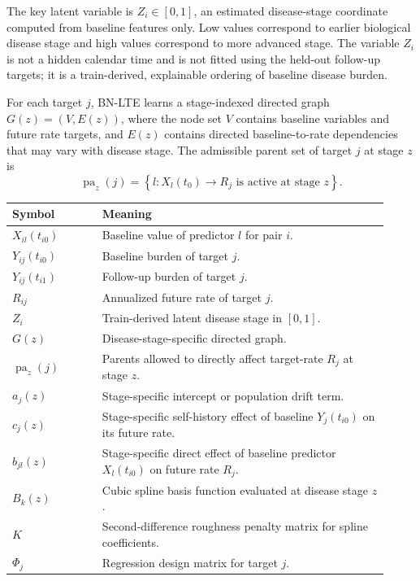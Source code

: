 The key latent variable is $Z_i \in [0,1]$, an estimated disease-stage
coordinate computed from baseline features only. Low values correspond to
earlier biological disease stage and high values correspond to more advanced
stage. The variable $Z_i$ is not a hidden calendar time and is not fitted using
the held-out follow-up targets; it is a train-derived, explainable ordering of
baseline disease burden.

For each target $j$, BN-LTE learns a stage-indexed directed graph
$G(z)=(V,E(z))$, where the node set $V$ contains baseline variables and future
rate targets, and $E(z)$ contains directed baseline-to-rate dependencies that
may vary with disease stage. The admissible parent set of target $j$ at stage
$z$ is
\begin{equation}
\operatorname{pa}_z(j)
=
\left\{
l : X_l(t_0) \rightarrow R_j
\text{ is active at stage } z
\right\}.
\end{equation}

\begin{center}
\begin{tabular}{p{0.22\linewidth}p{0.70\linewidth}}
Symbol & Meaning \\
\hline
$X_{il}(t_{i0})$ & Baseline value of predictor $l$ for pair $i$. \\
$Y_{ij}(t_{i0})$ & Baseline burden of target $j$. \\
$Y_{ij}(t_{i1})$ & Follow-up burden of target $j$. \\
$R_{ij}$ & Annualized future rate of target $j$. \\
$Z_i$ & Train-derived latent disease stage in $[0,1]$. \\
$G(z)$ & Disease-stage-specific directed graph. \\
$\operatorname{pa}_z(j)$ & Parents allowed to directly affect target-rate $R_j$ at stage $z$. \\
$a_j(z)$ & Stage-specific intercept or population drift term. \\
$c_j(z)$ & Stage-specific self-history effect of baseline $Y_j(t_{i0})$ on its future rate. \\
$b_{jl}(z)$ & Stage-specific direct effect of baseline predictor $X_l(t_{i0})$ on future rate $R_j$. \\
$B_k(z)$ & Cubic spline basis function evaluated at disease stage $z$. \\
$K$ & Second-difference roughness penalty matrix for spline coefficients. \\
$\Phi_j$ & Regression design matrix for target $j$. \\
\end{tabular}
\end{center}


